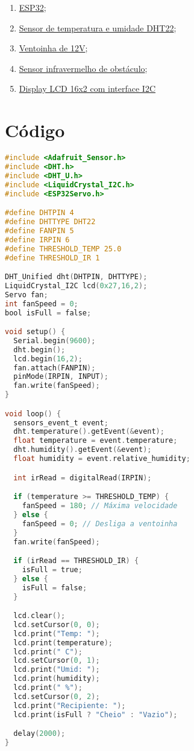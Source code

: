 \documentclass{article}
\begin{document}
\begin{enumerate}
\item \href{https://www.eletrogate.com/placa-wemos-d1-esp32-wifi-bluetooth}{ESP32};
\item \href{https://www.eletrogate.com/sensor-de-umidade-e-temperatura-dht11}{Sensor de temperatura e umidade DHT22};
\item \href{https://www.eletrogate.com/cooler-ventoinha-radial-5015-12v}{Ventoinha de 12V};
\item \href{https://www.eletrogate.com/sensor-de-obstaculo-reflexivo-infravermelho}{Sensor infravermelho de obstáculo};
\item \href{https://www.eletrogate.com/display-lcd-16x2-com-backlight-azul}{Display LCD 16x2 com interface I2C}
\end{enumerate}
\section{Código}
\begin{lstlisting}[language=C]
#include <Adafruit_Sensor.h>
#include <DHT.h>
#include <DHT_U.h>
#include <LiquidCrystal_I2C.h>
#include <ESP32Servo.h>

#define DHTPIN 4
#define DHTTYPE DHT22
#define FANPIN 5
#define IRPIN 6
#define THRESHOLD_TEMP 25.0
#define THRESHOLD_IR 1

DHT_Unified dht(DHTPIN, DHTTYPE);
LiquidCrystal_I2C lcd(0x27,16,2);
Servo fan;
int fanSpeed = 0;
bool isFull = false;

void setup() {
  Serial.begin(9600);
  dht.begin();
  lcd.begin(16,2);
  fan.attach(FANPIN);
  pinMode(IRPIN, INPUT);
  fan.write(fanSpeed);
}

void loop() {
  sensors_event_t event;
  dht.temperature().getEvent(&event);
  float temperature = event.temperature;
  dht.humidity().getEvent(&event);
  float humidity = event.relative_humidity;

  int irRead = digitalRead(IRPIN);

  if (temperature >= THRESHOLD_TEMP) {
    fanSpeed = 180; // Máxima velocidade
  } else {
    fanSpeed = 0; // Desliga a ventoinha
  }
  fan.write(fanSpeed);

  if (irRead == THRESHOLD_IR) {
    isFull = true;
  } else {
    isFull = false;
  }

  lcd.clear();
  lcd.setCursor(0, 0);
  lcd.print("Temp: ");
  lcd.print(temperature);
  lcd.print(" C");
  lcd.setCursor(0, 1);
  lcd.print("Umid: ");
  lcd.print(humidity);
  lcd.print(" %");
  lcd.setCursor(0, 2);
  lcd.print("Recipiente: ");
  lcd.print(isFull ? "Cheio" : "Vazio");

  delay(2000);
}
\end{lstlisting}
\end{document}
